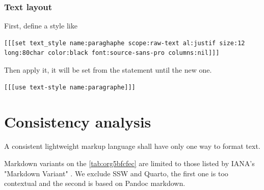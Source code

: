 \documentclass[a4paper,12pt]{article}
\begin{document}
\subsubsection{Text layout}
\label{sec:org0b50a57}
First, define a style like
\begin{verbatim}
[[[set text_style name:paraghaphe scope:raw-text al:justif size:12 long:80char color:black font:source-sans-pro columns:nil]]]
\end{verbatim}

Then apply it, it will be set from the statement until the new one.
\begin{verbatim}
[[[use text-style name:paragraphe]]]
\end{verbatim}
\section{Consistency analysis}
\label{sec:org22c5cf5}
A consistent lightweight markup language shall have only one way to format text.

Markdown variants on the \ref{tab:org5bfcfec} are limited to those listed by IANA's "Markdown Variant" \autocite{MarkdownVariants2023}. We exclude SSW and Quarto, the first one is too contextual and the second is based on Pandoc markdown.
\end{document}
